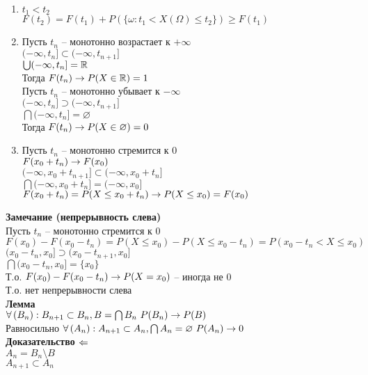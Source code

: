 \documentclass[12pt]{article}
\begin{document}
\begin{enumerate}
    \item $t_1 < t_2$\\
    $F(t_2) = F(t_1) + P(\{\omega: t_1 < X(\Omega) \leq t_2\}) \geq F(t_1)$
    \item Пусть $t_n$ -- монотонно возрастает к $+\infty$\\
    $(-\infty, t_n] \subset (-\infty, t_{n+1}]$\\
    $\bigcup (-\infty,t_n] = \mathbb{R}$\\
    Тогда $F(t_n) \rightarrow P(X \in \mathbb{R}) = 1$\\
    Пусть $t_n$ -- монотонно убывает к $-\infty$\\
    $(-\infty, t_n] \supset (-\infty, t_{n+1}]$\\
    $\bigcap (-\infty, t_n] = \varnothing$\\
    Тогда $F(t_n) \rightarrow P(X \in \varnothing) = 0$
    \item Пусть $t_n$ -- монотонно стремится к 0\\
    $F(x_0 + t_n) \rightarrow F(x_0)$\\
    $(-\infty, x_0 + t_{n+1}] \subset (-\infty, x_0 + t_n]$\\
    $\bigcap (-\infty, x_0 + t_{n}] = (-\infty, x_0]$\\
    $F(x_0+t_n) = P(X \leq x_0 + t_n) \rightarrow P(X \leq x_0) = F(x_0)$
\end{enumerate}
\textbf{Замечание (непрерывность слева)}\\
Пусть $t_n$ -- монотонно стремится к 0\\
$F(x_0) - F(x_0 - t_n) = P(X \leq x_0) - P(X \leq x_0 - t_n) = P(x_0 - t_n < X \leq x_0)$\\
$(x_0 - t_n, x_0] \supset (x_0-t_{n+1}, x_0]$\\
$\bigcap (x_0-t_n, x_0] = \{x_0\}$\\
Т.о. $F(x_0) - F(x_0 - t_n) \rightarrow P(X = x_0)$ -- иногда не 0\\
Т.о. нет непрерывности слева\\
\textbf{Лемма}\\
$\forall\, (B_n): B_{n+1}\subset B_n, B = \bigcap B_n\ P(B_n) \rightarrow P(B)$\\
Равносильно $\forall\, (A_n): A_{n+1} \subset A_n, \bigcap A_n = \varnothing\ P(A_n) \rightarrow 0$\\
\textbf{Доказательство $\Leftarrow$}\\
$A_n = B_n \setminus B$\\
$A_{n+1} \subset A_n$\\
\end{document}
